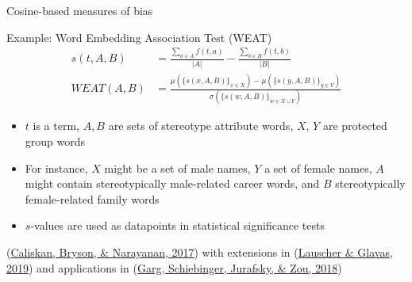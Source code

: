 \documentclass[
  10pt,
  ignorenonframetext,
  x11names, dvipsnames, bibspacing,natbib]{beamer}
\begin{document}
\begin{frame}{Cosine-based measures of bias}
\protect\hypertarget{cosine-based-measures-of-bias-5}{}
\begin{block}{Example: Word Embedding Association Test (WEAT)}
\protect\hypertarget{example-word-embedding-association-test-weat-1}{}
\begin{align*}
s(t,A,B) & = \frac{\sum_{a\in A}f(t,a)}{\vert A\vert} - \frac{\sum_{b\in B}f(t,b)}{\vert B\vert}
\\
WEAT(A,B) & = \frac{
\mu\left(\{s(x,A,B)\}_{x\in X}\right) -\mu\left(\{s(y,A,B)\}_{y\in Y}\right) 
}{
\sigma\left(\{s(w,A,B)\}_{w\in X\cup Y}\right)
}
\end{align*}

\begin{itemize}
\item
  \(t\) is a term, \(A, B\) are sets of stereotype attribute words,
  \(X\), \(Y\) are protected group words
\item
  For instance, \(X\) might be a set of male names, \(Y\) a set of
  female names, \(A\) might contain stereotypically male-related career
  words, and \(B\) stereotypically female-related family words
\item
  \(s\)-values are used as datapoints in statistical significance tests
\end{itemize}

\footnotesize

\vspace{2mm}

(\protect\hyperlink{ref-Caliskan2017semanticsBiases}{Caliskan, Bryson,
\& Narayanan, 2017}) with extensions in
(\protect\hyperlink{ref-Lauscher2019multidimensional}{Lauscher \&
Glavas, 2019}) and applications in
(\protect\hyperlink{ref-Garg2018years}{Garg, Schiebinger, Jurafsky, \&
Zou, 2018})
\end{block}
\end{frame}
\end{document}
